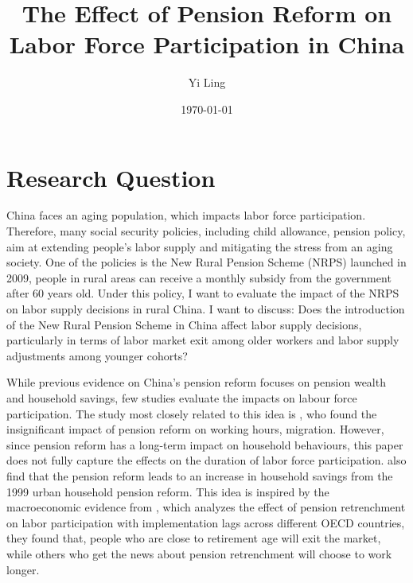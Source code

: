 




\title{\Large \textbf{The Effect of Pension Reform on Labor Force Participation in China}}
\author{Yi Ling}

\date{\today}

\maketitle

\thispagestyle{empty} 
\doublespacing
\thispagestyle{empty} 

\section{Research Question}

China faces an aging population, which impacts labor force participation. Therefore, many social security policies, including child allowance, pension policy, aim at extending people's labor supply and mitigating the stress from an aging society. One of the policies is the New Rural Pension Scheme (NRPS) launched in 2009, people in rural areas can receive a monthly subsidy from the government after 60 years old. Under this policy, I want to evaluate the impact of the NRPS on labor supply decisions in rural China. I want to discuss: Does the introduction of the New Rural Pension Scheme in China affect labor supply decisions, particularly in terms of labor market exit among older workers and labor supply adjustments among younger cohorts?

While previous evidence on China's pension reform focuses on pension wealth and household savings, few studies evaluate the impacts on labour force participation. The study most closely related to this idea is \cite{huaDoesPensionAffect2022}, who found the insignificant impact of pension reform on working hours, migration. However, since pension reform has a long-term impact on household behaviours, this paper does not fully capture the effects on the duration of labor force participation. \citet{fengPublicPensionHousehold2011a} also find that the pension reform leads to an increase in household savings from the 1999 urban household pension reform. This idea is inspired by the macroeconomic evidence from \citet{biPublicPensionReforms2023}, which analyzes the effect of pension retrenchment on labor participation with implementation lags across different OECD countries, they found that, people who are close to retirement age will exit the market, while others who get the news about pension retrenchment will choose to work longer. 


